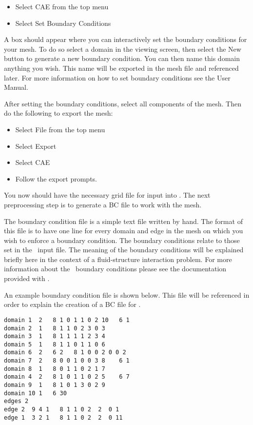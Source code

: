 \begin{itemize}
	\item Select CAE from the top menu
	\item Select Set Boundary Conditions
\end{itemize}

A box should appear where you can interactively set the boundary conditions for your mesh. To do so select a domain in the viewing screen, then select the New button to generate a new boundary condition. You can then name this domain anything you wish. This name will be exported in the mesh file and referenced later. For more information on how to set boundary conditions see the  User Manual.

After setting the boundary conditions, select all components of the mesh. Then do the following to export the mesh:

\begin{itemize}
	\item Select File from the top menu
	\item Select Export
	\item Select CAE
	\item Follow the export prompts.
\end{itemize}

You now should have the necessary grid file for input into \grid. The next preprocessing step is to generate a BC file to work with the mesh.


The boundary condition file is a simple text file written by hand. The format of this file is to have one line for every domain and edge in the mesh on which you wish to enforce a boundary condition. The boundary conditions relate to those set in the \rocfrac\, input file. The meaning of the boundary conditions will be explained briefly here in the context of a fluid-structure interaction problem. For more information about the \rocfrac\, boundary conditions please see the documentation provided with \rocfrac. 

An example boundary condition file is shown below. This file will be referenced in order to explain the creation of a BC file for \grid.

\begin{framed}
\vspace{-10pt}
\begin{verbatim}
domain 1  2   8 1 0 1 1 0 2 10   6 1 
domain 2  1   8 1 1 0 2 3 0 3      
domain 3  1   8 1 1 1 1 2 3 4   
domain 5  1   8 1 1 0 1 1 0 6   
domain 6  2   6 2   8 1 0 0 2 0 0 2
domain 7  2   8 0 0 1 0 0 3 8    6 1 
domain 8  1   8 0 1 1 0 2 1 7   
domain 4  2   8 1 0 1 1 0 2 5    6 7 
domain 9  1   8 1 0 1 3 0 2 9   
domain 10 1   6 30 
edges 2
edge 2  9 4 1   8 1 1 0 2  2  0 1   
edge 1  3 2 1   8 1 1 0 2  2  0 11  
\end{verbatim}
\end{framed}


